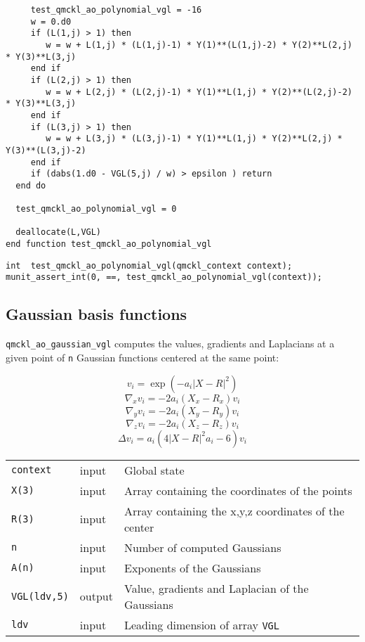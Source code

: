 \begin{verbatim}
     test_qmckl_ao_polynomial_vgl = -16
     w = 0.d0
     if (L(1,j) > 1) then
        w = w + L(1,j) * (L(1,j)-1) * Y(1)**(L(1,j)-2) * Y(2)**L(2,j) * Y(3)**L(3,j) 
     end if
     if (L(2,j) > 1) then
        w = w + L(2,j) * (L(2,j)-1) * Y(1)**L(1,j) * Y(2)**(L(2,j)-2) * Y(3)**L(3,j) 
     end if
     if (L(3,j) > 1) then
        w = w + L(3,j) * (L(3,j)-1) * Y(1)**L(1,j) * Y(2)**L(2,j) * Y(3)**(L(3,j)-2) 
     end if
     if (dabs(1.d0 - VGL(5,j) / w) > epsilon ) return
  end do

  test_qmckl_ao_polynomial_vgl = 0

  deallocate(L,VGL)
end function test_qmckl_ao_polynomial_vgl
\end{verbatim}

\begin{verbatim}
int  test_qmckl_ao_polynomial_vgl(qmckl_context context);
munit_assert_int(0, ==, test_qmckl_ao_polynomial_vgl(context));
\end{verbatim}

\subsection{Gaussian basis functions}
\label{sec:org29184a6}

\texttt{qmckl\_ao\_gaussian\_vgl} computes the values, gradients and
Laplacians at a given point of \texttt{n} Gaussian functions centered at
the same point:

\[ v_i = \exp(-a_i |X-R|^2) \]
\[ \nabla_x v_i = -2 a_i (X_x -  R_x) v_i \]
\[ \nabla_y v_i = -2 a_i (X_y -  R_y) v_i \]
\[ \nabla_z v_i = -2 a_i (X_z -  R_z) v_i \]
\[ \Delta v_i = a_i (4 |X-R|^2 a_i - 6) v_i \]

\begin{center}
\begin{tabular}{lll}
\texttt{context} & input & Global state\\
\texttt{X(3)} & input & Array containing the coordinates of the points\\
\texttt{R(3)} & input & Array containing the x,y,z coordinates of the center\\
\texttt{n} & input & Number of computed Gaussians\\
\texttt{A(n)} & input & Exponents of the Gaussians\\
\texttt{VGL(ldv,5)} & output & Value, gradients and Laplacian of the Gaussians\\
\texttt{ldv} & input & Leading dimension of array \texttt{VGL}\\
\end{tabular}
\end{center}

